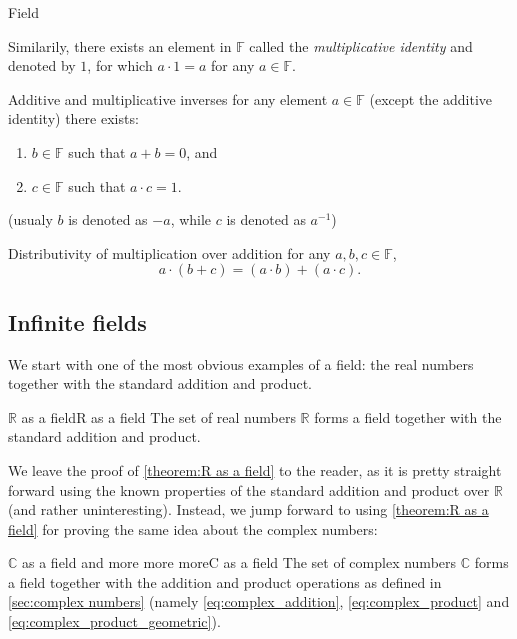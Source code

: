 \begin{definition}{Field}{}
\begin{descitemize}
			Similarily, there exists an element in $\mathbb{F}$ called the \textit{multiplicative identity} and denoted by $1$, for which $a\cdot1=a$ for any $a\in\mathbb{F}$.

		\item[Additive and multiplicative inverses] for any element $a\in\mathbb{F}$ (except the additive identity) there exists:
			\begin{enumerate}
				\item $b\in\mathbb{F}$ such that $a+b=0$, and
				\item $c\in\mathbb{F}$ such that $a\cdot c=1$.
			\end{enumerate}
			(usualy $b$ is denoted as $-a$, while $c$ is denoted as $a^{-1}$)

		\item[Distributivity of multiplication over addition] for any $a,b,c\in\mathbb{F}$,
			\[
				a\cdot(b+c) = (a\cdot b) + (a\cdot c).
			\]
	\end{descitemize}
\end{definition}

\subsection{Infinite fields}
We start with one of the most obvious examples of a field: the real numbers together with the standard addition and product.

\begin{theorem}{$\bm{\mathbb{R}}$ as a field}{R as a field}
	The set of real numbers $\mathbb{R}$ forms a field together with the standard addition and product.
\end{theorem}

We leave the proof of \autoref{theorem:R as a field} to the reader, as it is pretty straight forward using the known properties of the standard addition and product over $\mathbb{R}$ (and rather uninteresting). Instead, we jump forward to using \autoref{theorem:R as a field} for proving the same idea about the complex numbers:

\begin{theorem}{$\bm{\mathbb{C}}$ as a field and more more more}{C as a field}
	The set of complex numbers $\mathbb{C}$ forms a field together with the addition and product operations as defined in \autoref{sec:complex numbers} (namely \autoref{eq:complex_addition}, \autoref{eq:complex_product} and \autoref{eq:complex_product_geometric}).
\end{theorem}

